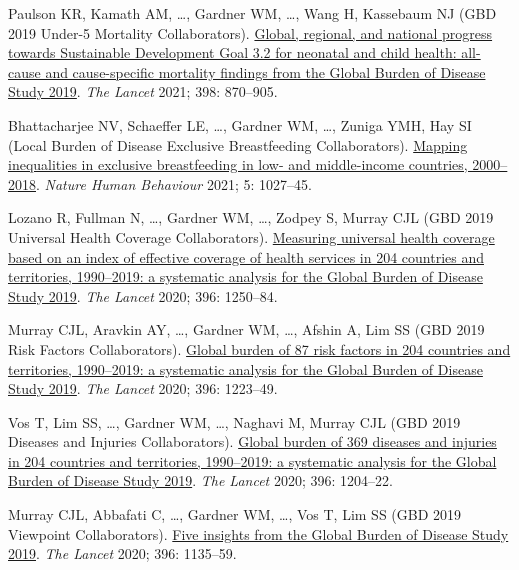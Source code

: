 \documentclass[11pt,article,oneside]{memoir}
\begin{document}
\begin{publist}
\item Paulson KR, Kamath AM, \ldots, {\minbold Gardner WM}, \ldots, Wang H, Kassebaum NJ (GBD 2019 Under-5 Mortality Collaborators). \href{https://doi.org/10.1016/S0140-6736(21)01207-1}{Global, regional, and national progress towards Sustainable Development Goal 3.2 for neonatal and child health: all-cause and cause-specific mortality findings from the Global Burden of Disease Study 2019}. \emph{The Lancet} 2021; 398: 870--905.

\item Bhattacharjee NV, Schaeffer LE, \ldots, {\minbold Gardner WM}, \ldots, Zuniga YMH, Hay SI (Local Burden of Disease Exclusive Breastfeeding Collaborators). \href{https://doi.org/10.1038/s41562-021-01108-6}{Mapping inequalities in exclusive breastfeeding in low- and middle-income countries, 2000--2018}. \emph{Nature Human Behaviour} 2021; 5: 1027--45.

\item Lozano R, Fullman N, \ldots, {\minbold Gardner WM}, \ldots, Zodpey S, Murray CJL (GBD 2019 Universal Health Coverage Collaborators). \href{https://doi.org/10.1016/S0140-6736(20)30750-9}{Measuring universal health coverage based on an index of effective coverage of health services in 204 countries and territories, 1990--2019: a systematic analysis for the Global Burden of Disease Study 2019}. \emph{The Lancet} 2020; 396: 1250--84.

\item Murray CJL, Aravkin AY, \ldots, {\minbold Gardner WM}, \ldots, Afshin A, Lim SS (GBD 2019 Risk Factors Collaborators). \href{https://doi.org/10.1016/S0140-6736(20)30752-2}{Global burden of 87 risk factors in 204 countries and territories, 1990--2019: a systematic analysis for the Global Burden of Disease Study 2019}. \emph{The Lancet} 2020; 396: 1223--49.

\item Vos T, Lim SS, \ldots, {\minbold Gardner WM}, \ldots, Naghavi M, Murray CJL (GBD 2019 Diseases and Injuries Collaborators). \href{https://doi.org/10.1016/S0140-6736(20)30925-9}{Global burden of 369 diseases and injuries in 204 countries and territories, 1990--2019: a systematic analysis for the Global Burden of Disease Study 2019}. \emph{The Lancet} 2020; 396: 1204--22.

\item Murray CJL, Abbafati C, \ldots, {\minbold Gardner WM}, \ldots, Vos T, Lim SS (GBD 2019 Viewpoint Collaborators). \href{https://doi.org/10.1016/S0140-6736(20)31404-5}{Five insights from the Global Burden of Disease Study 2019}. \emph{The Lancet} 2020; 396: 1135--59.


\end{publist}
\end{document}
